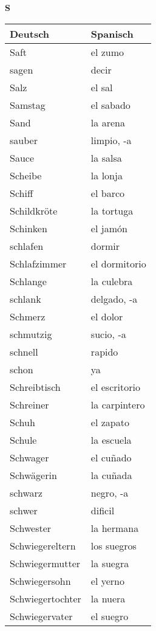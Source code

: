 \begin{flushright}\begin{Huge}\textbf{S}\end{Huge}\end{flushright}

\begin{longtable}{p{} p{}} 
\textbf{Deutsch}     & \textbf{Spanisch}                                       \\ \hline
\hline
\endhead %
Saft & el zumo\\
sagen & decir \\
Salz & el sal\\
Samstag & el sabado\\
Sand & la arena\\
sauber & limpio, -a\\
Sauce & la salsa\\
Scheibe & la lonja\\
Schiff & el barco\\
Schildkröte & la tortuga\\
Schinken & el jamón\\
schlafen & dormir\\
Schlafzimmer & el dormitorio\\
Schlange & la culebra\\
schlank & delgado, -a\\
Schmerz & el dolor\\
schmutzig & sucio, -a\\
schnell & rapido\\
schon & ya\\
Schreibtisch & el escritorio\\
Schreiner & la carpintero\\
Schuh & el zapato\\
Schule & la escuela\\
Schwager & el cuñado\\
Schwägerin & la cuñada\\
schwarz & negro, -a\\
schwer & dificil\\
Schwester & la hermana\\
Schwiegereltern & los suegros\\
Schwiegermutter & la suegra\\
Schwiegersohn & el yerno\\
Schwiegertochter & la nuera\\
Schwiegervater & el suegro\\

\end{longtable}
